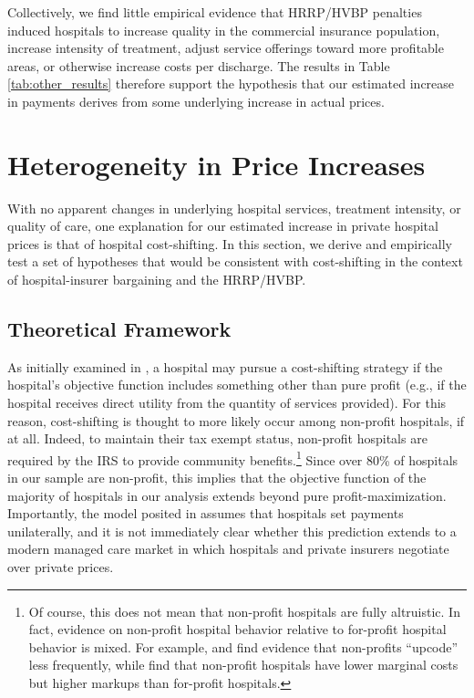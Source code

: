 \documentclass[12pt]{article}
\begin{document}
Collectively, we find little empirical evidence that HRRP/HVBP penalties induced hospitals to increase quality in the commercial insurance population, increase intensity of treatment, adjust service offerings toward more profitable areas, or otherwise increase costs per discharge. The results in Table \ref{tab:other_results} therefore support the hypothesis that our estimated increase in payments derives from some underlying increase in actual prices.

\section{Heterogeneity in Price Increases}
\label{sec:Ext}
With no apparent changes in underlying hospital services, treatment intensity, or quality of care, one explanation for our estimated increase in private hospital prices is that of hospital cost-shifting. In this section, we derive and empirically test a set of hypotheses that would be consistent with cost-shifting in the context of hospital-insurer bargaining and the HRRP/HVBP.

\subsection{Theoretical Framework}
As initially examined in \cite{dranove1988}, a hospital may pursue a cost-shifting strategy if the hospital's objective function includes something other than pure profit (e.g., if the hospital receives direct utility from the quantity of services provided). For this reason, cost-shifting is thought to more likely occur among non-profit hospitals, if at all. Indeed, to maintain their tax exempt status, non-profit hospitals are required by the IRS to provide community benefits.\footnote{Of course, this does not mean that non-profit hospitals are fully altruistic. In fact, evidence on non-profit hospital behavior relative to for-profit hospital behavior is mixed. For example, \cite{silverman2004} and \cite{dafny2005} find evidence that non-profits ``upcode'' less frequently, while \cite{gaynor2003} find that non-profit hospitals have lower marginal costs but higher markups than for-profit hospitals.} Since over 80\% of hospitals in our sample are non-profit, this implies that the objective function of the majority of hospitals in our analysis extends beyond pure profit-maximization.  Importantly, the model posited in \cite{dranove1988} assumes that hospitals set payments unilaterally, and it is not immediately clear whether this prediction extends to a modern managed care market in which hospitals and private insurers negotiate over private prices.
\end{document}
